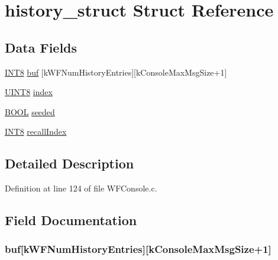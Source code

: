 \hypertarget{structhistory__struct}{}\section{history\+\_\+struct Struct Reference}
\label{structhistory__struct}
\subsection*{Data Fields}
\begin{DoxyCompactItemize}
\item 
\hyperlink{_generic_type_defs_8h_a7ebe70ceca856797319175e30bcf003d}{I\+N\+T8} \hyperlink{structhistory__struct_ae9530a337a451b64e24682abce6a500b}{buf} \mbox{[}k\+W\+F\+Num\+History\+Entries\mbox{]}\mbox{[}k\+Console\+Max\+Msg\+Size+1\mbox{]}
\item 
\hyperlink{_generic_type_defs_8h_ab27e9918b538ce9d8ca692479b375b6a}{U\+I\+N\+T8} \hyperlink{structhistory__struct_a6dc036ae121d473e80cf2815a3e5549e}{index}
\item 
\hyperlink{_generic_type_defs_8h_a54d65c7fa62e62c9754371e42f5111b9}{B\+O\+O\+L} \hyperlink{structhistory__struct_aaa407061ffd9b3743479271b44745e9d}{seeded}
\item 
\hyperlink{_generic_type_defs_8h_a7ebe70ceca856797319175e30bcf003d}{I\+N\+T8} \hyperlink{structhistory__struct_ac4e3e0a73368ca4b2c373b4f7a1e33ba}{recall\+Index}
\end{DoxyCompactItemize}


\subsection{Detailed Description}


Definition at line 124 of file W\+F\+Console.\+c.



\subsection{Field Documentation}
\hypertarget{structhistory__struct_ae9530a337a451b64e24682abce6a500b}{}
\subsubsection[{buf}]{ buf\mbox{[}k\+W\+F\+Num\+History\+Entries\mbox{]}\mbox{[}k\+Console\+Max\+Msg\+Size+1\mbox{]}}\label{structhistory__struct_ae9530a337a451b64e24682abce6a500b}


